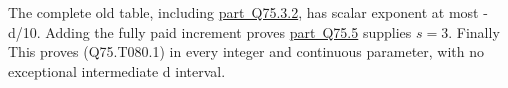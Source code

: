The complete old table, including \mbox{\hyperref[part:Q75.3.2]{part Q75.3.2}}, has scalar exponent
at most -d/10. Adding the fully paid increment proves
\mbox{\hyperref[part:Q75.5]{part Q75.5}} supplies \(s=3.\) Finally
This proves (Q75.T080.1) in every integer and continuous parameter,
with no exceptional intermediate d interval.
